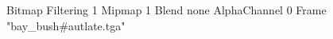 {Bitmap
	{Filtering 1}
	{Mipmap 1}
	{Blend none}
	{AlphaChannel 0}
	{Frame "bay_bush#autlate.tga"}
}
